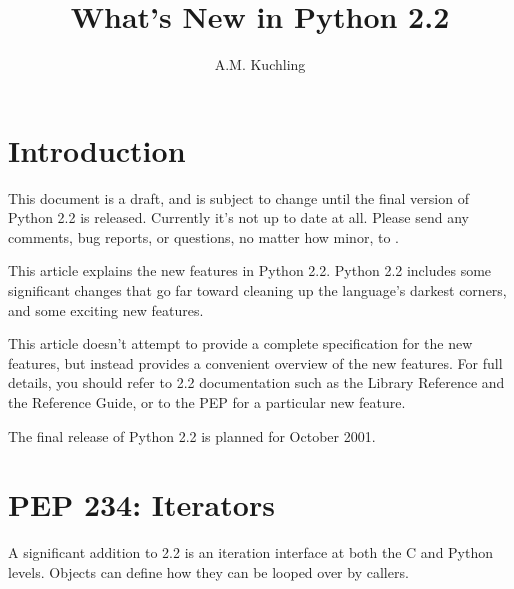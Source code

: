 \documentclass{howto}
\title{What's New in Python 2.2}
\author{A.M. Kuchling}
\begin{document}
\maketitle\tableofcontents

\section{Introduction}

{\large This document is a draft, and is subject to change until the
final version of Python 2.2 is released.  Currently it's not up to
date at all.  Please send any comments, bug reports, or questions, no
matter how minor, to .  }

This article explains the new features in Python 2.2.  Python 2.2
includes some significant changes that go far toward cleaning up the
language's darkest corners, and some exciting new features.

This article doesn't attempt to provide a complete specification for
the new features, but instead provides a convenient overview of the
new features.  For full details, you should refer to 2.2 documentation
such as the Library Reference and the Reference Guide, or to the PEP
for a particular new feature.

The final release of Python 2.2 is planned for October 2001.






\section{PEP 234: Iterators}

A significant addition to 2.2 is an iteration interface at both the C
and Python levels.  Objects can define how they can be looped over by
callers.
\end{document}
